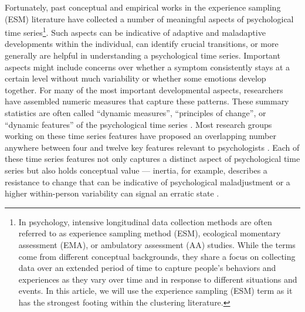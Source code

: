 \documentclass[man, 12pt, a4paper, floatsintext]{apa7}
\theoremstyle{break}
\theoremstyle{plain}
\begin{document}
Fortunately, past conceptual and empirical works in the experience sampling (ESM) literature have collected a number of meaningful aspects of psychological time series\footnote{In psychology, intensive longitudinal data collection methods are often referred to as experience sampling method (ESM), ecological momentary assessment (EMA), or ambulatory assessment (AA) studies. While the terms come from different conceptual backgrounds, they share a focus on collecting data over an extended period of time to capture people's behaviors and experiences as they vary over time and in response to different situations and events. In this article, we will use the experience sampling (ESM) term as it has the strongest footing within the clustering literature.}. Such aspects can be indicative of adaptive and maladaptive developments within the individual, can identify crucial transitions, or more generally are helpful in understanding a psychological time series. Important aspects might include concerns over whether a symptom consistently stays at a certain level without much variability or whether some emotions develop together. For many of the most important developmental aspects, researchers have assembled numeric measures that capture these patterns. These summary statistics are often called ``dynamic measures'', ``principles of change'', or ``dynamic features'' of the psychological time series \citep{dejonckheere2019, kuppens2017, krone2018}. Most research groups working on these time series features have proposed an overlapping number anywhere between four and twelve key features relevant to psychologists \citep[][]{wang2006, dejonckheere2019}. Each of these time series features not only captures a distinct aspect of psychological time series but also holds conceptual value --- inertia, for example, describes a resistance to change that can be indicative of psychological maladjustment \citep{kuppens2010} or a higher within-person variability can signal an erratic state \citep{myin-germeys2018}.
\end{document}
